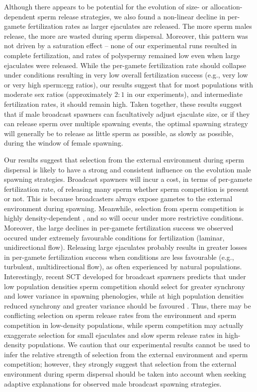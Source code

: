 \documentclass{article}
\begin{document}
Although there appears to be potential for the evolution of size- or allocation-dependent sperm release strategies, we also found a non-linear decline in per-gamete fertilization rates as larger ejaculates are released. The more sperm males release, the more are wasted during sperm dispersal. Moreover, this pattern was not driven by a saturation effect -- none of our experimental runs resulted in complete fertilization, and rates of polyspermy remained low even when large ejaculates were released. While the per-gamete fertilization rate should collapse under conditions resulting in very low overall fertilization success (e.g., very low or very high sperm:egg ratios), our results suggest that for most populations with moderate sex ratios (approximately $2:1$ in our experiments), and intermediate fertilization rates, it should remain high. Taken together, these results suggest that if male broadcast spawners can facultatively adjust ejaculate size, or if they can release sperm over multiple spawning events, the optimal spawning strategy will generally be to release as little sperm as possible, as slowly as possible, during the window of female spawning. 

Our results suggest that selection from the external environment during sperm dispersal is likely to have a strong and consistent influence on the evolution male spawning strategies. Broadcast spawners will incur a cost, in terms of per-gamete fertilization rate, of releasing many sperm whether sperm competition is present or not. This is because broadcasters always expose gametes to the external environment during spawning. Meanwhile, selection from sperm competition is highly density-dependent \citep{Parker1982,Levitan1998,BodeMarshall2007,Parker2017}, and so will occur under more restrictive conditions. Moreover, the large declines in per-gamete fertilization success we observed occured under extremely favourable conditions for fertilization (laminar, unidirectional flow). Releasing large ejaculates probably results in greater losses in per-gamete fertilization success when conditions are less favourable (e.g., turbulent, multidirectional flow), as often experienced by natural populations. Interestingly, recent SCT developed for broadcast spawners predicts that under low population densities sperm competition should select for greater synchrony and lower variance in spawning phenologies, while at high population densities reduced synchrony and greater variance should be favoured \citep{Olito2015,Olito2017}. Thus, there may be conflicting selection on sperm release rates from the environment and sperm competition in low-density populations, while sperm competition may actually exaggerate selection for small ejaculates and slow sperm release rates in high-density populations. We caution that our experimental results cannot be used to infer the relative strength of selection from the external environment and sperm competition; however, they strongly suggest that selection from the external environment during sperm dispersal should be taken into account when seeking adaptive explanations for observed male broadcast spawning strategies.
\end{document}
